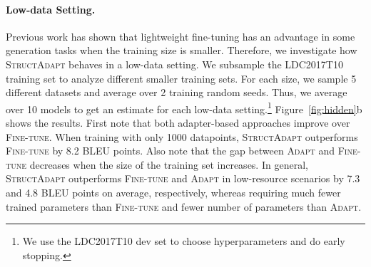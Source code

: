 \documentclass[11pt]{article}
\newcommand{\graphadapter}{{\small\textsc{StructAdapt}}\xspace}
\newcommand{\vanilladapter}{{\small\textsc{Adapt}}\xspace}
\newcommand{\finetune}{{\small\textsc{Fine-tune}}\xspace}
\begin{document}
\paragraph{Low-data Setting.}
Previous work \cite{li2021prefixtuning} has shown that lightweight fine-tuning has an advantage in some generation tasks when the training size is smaller. Therefore, we investigate how \graphadapter behaves in a low-data setting. We subsample the LDC2017T10 training set to analyze different smaller training sets. For each size, we sample 5 different datasets and average over 2 training random seeds. Thus, we average over 10 models to get an estimate for each low-data setting.\footnote{We use the LDC2017T10 dev set to choose hyperparameters and do early stopping.} Figure~\ref{fig:hidden}b shows the results. First note that both adapter-based approaches improve over \finetune. When training with only 1000 datapoints, \graphadapter outperforms \finetune by 8.2 BLEU points. Also note that the gap between \vanilladapter and \finetune decreases when the size of the training set increases. In general, \graphadapter outperforms \finetune and \vanilladapter in low-resource scenarios by 7.3 and 4.8 BLEU points on average, respectively, whereas requiring much fewer trained parameters than \finetune and fewer number of parameters than \vanilladapter. 
\end{document}
